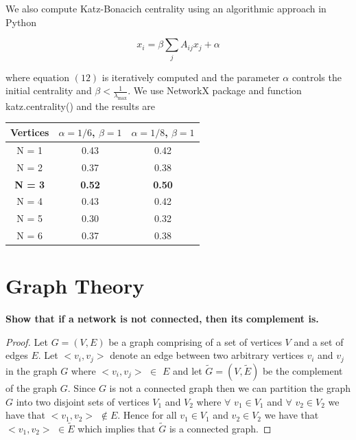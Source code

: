 \documentclass[a4paper]{article}
\begin{document}
\noindent We also compute Katz-Bonacich centrality using an algorithmic approach in Python 

\begin{equation}
x_i = \beta \sum_j A_{ij}x_j + \alpha
\end{equation}

where equation $(12)$ is iteratively computed and the parameter $\alpha$ controls the initial centrality and $\beta < \frac{1}{\lambda_{\text{max}}}$. We use NetworkX package and function katz.centrality() and the results are

\begin{table}[ht!]
	\centering
	 \label{tab:title} 
	\begin{tabular}{ccc}
		\hline
		
		Vertices & $\alpha = 1/6$, $\beta = 1$ & $\alpha = 1/8$, $\beta = 1$\\
		\hline\hline
		N = 1 & 0.43  &  0.42 \\ 
		N = 2 & 0.37  & 0.38 \\
		\textbf{{\color{blue} N = 3}} & \textbf{{\color{blue} 0.52}} &  \textbf{{\color{blue} 0.50}} \\
		N = 4 & 0.43 & 0.42 \\
		N = 5 & 0.30 & 0.32 \\
		N = 6 & 0.37 & 0.38 \\
		
		\bottomrule[1pt]
	\end{tabular}
\end{table}




\vspace{3cm}

\section*{Graph Theory}

\noindent\textbf{{\color{blue} Show that if a network is not connected, then its complement is.}}

\begin{proof}
	Let $G = (V,E)$ be a graph comprising of a set of vertices $V$ and a set of edges $E$. Let $<v_i, v_j>$ denote an edge between two arbitrary vertices $v_i$ and $v_j$ in the graph $G$ where  $<v_i, v_j>$ $\in$ $E$ and let $\tilde{G} = (V,\tilde{E})$ be the complement of the graph $G$. Since $G$ is not a connected graph then we can partition the graph $G$ into two disjoint sets of vertices $V_1$ and $V_2$ where $\forall$ $v_1 \in V_1$ and $\forall$ $v_2 \in V_2$ we have that $<v_1,v_2>$ $\notin E$. Hence for all $v_1\in V_1$ and $v_2\in V_2$ we have that $<v_1, v_2>$ $ \in \tilde{E}$ which implies that $\tilde{G}$ is a connected graph. 
\end{proof}
\end{document}
